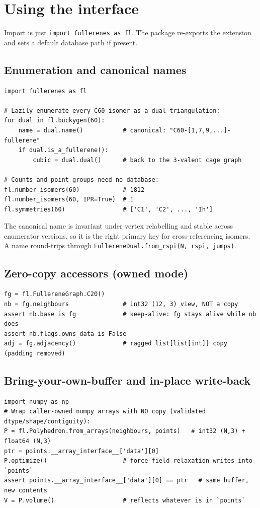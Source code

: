 \documentclass[11pt]{article}
\newcommand{\code}[1]{\lstinline[style=py]!#1!}
\begin{document}
\section{Using the interface}
\label{sec:usage}

Import is just \code{import fullerenes as fl}. The package re-exports the extension and
sets a default database path if present.

\subsection{Enumeration and canonical names}
\begin{lstlisting}
import fullerenes as fl

# Lazily enumerate every C60 isomer as a dual triangulation:
for dual in fl.buckygen(60):
    name = dual.name()           # canonical: "C60-[1,7,9,...]-fullerene"
    if dual.is_a_fullerene():
        cubic = dual.dual()      # back to the 3-valent cage graph

# Counts and point groups need no database:
fl.number_isomers(60)            # 1812
fl.number_isomers(60, IPR=True)  # 1
fl.symmetries(60)                # ['C1', 'C2', ..., 'Ih']
\end{lstlisting}
The canonical name is invariant under vertex relabelling and stable across enumerator
versions, so it is the right primary key for cross-referencing isomers. A name round-trips
through \code{FullereneDual.from_rspi(N, rspi, jumps)}.

\subsection{Zero-copy accessors (owned mode)}
\begin{lstlisting}
fg = fl.FullereneGraph.C20()
nb = fg.neighbours               # int32 (12, 3) view, NOT a copy
assert nb.base is fg             # keep-alive: fg stays alive while nb does
assert nb.flags.owns_data is False
adj = fg.adjacency()             # ragged list[list[int]] copy (padding removed)
\end{lstlisting}

\subsection{Bring-your-own-buffer and in-place write-back}
\begin{lstlisting}
import numpy as np
# Wrap caller-owned numpy arrays with NO copy (validated dtype/shape/contiguity):
P = fl.Polyhedron.from_arrays(neighbours, points)   # int32 (N,3) + float64 (N,3)
ptr = points.__array_interface__['data'][0]
P.optimize()                     # force-field relaxation writes into `points`
assert points.__array_interface__['data'][0] == ptr   # same buffer, new contents
V = P.volume()                   # reflects whatever is in `points`
\end{lstlisting}
\end{document}
